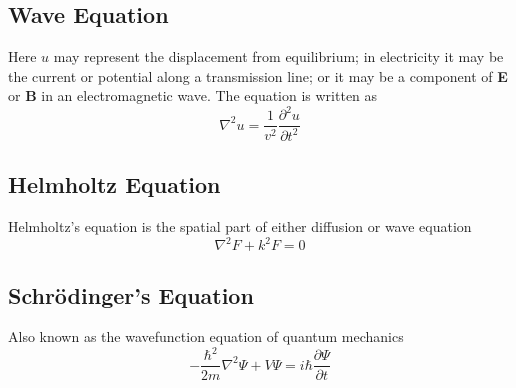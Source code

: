\documentclass[../main.tex]{subfiles}
\begin{document}
\subsection*{Wave Equation}
Here $u$ may represent the displacement from equilibrium; in electricity it may be the current or potential along a transmission line; or it may be a component of \textbf{E} or \textbf{B} in an electromagnetic wave. The equation is written as 
\begin{equation*}
    \nabla^2u=\frac{1}{v^2}\frac{\partial^2u}{\partial t^2}
\end{equation*}

\subsection*{Helmholtz Equation}
Helmholtz's equation is the spatial part of either diffusion or wave equation
\begin{equation*}
    \nabla^2F+k^2F=0
\end{equation*}

\subsection*{Schrödinger's Equation}
Also known as the wavefunction equation of quantum mechanics
\begin{equation*}
    -\frac{\hbar^2}{2m}\nabla^2\Psi+V\Psi= i\hbar\frac{\partial \Psi}{\partial t}
\end{equation*}
\end{document}
